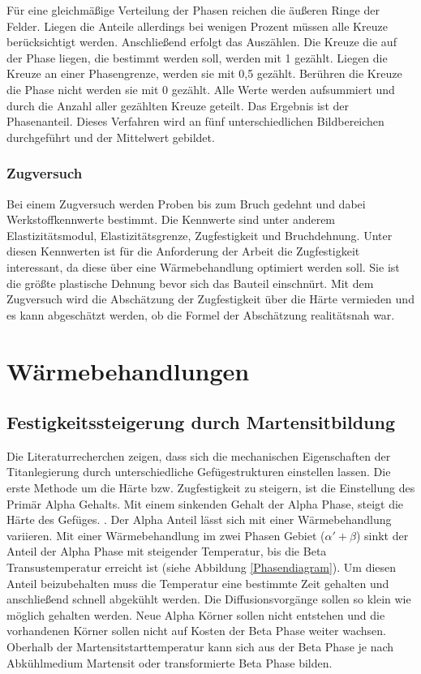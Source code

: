 \documentclass[a4paper, 11pt]{tubsreprt}
\begin{document}
Für eine gleichmäßige Verteilung der Phasen reichen die äußeren Ringe der Felder. Liegen die Anteile allerdings bei wenigen Prozent müssen alle Kreuze berücksichtigt werden. 
Anschließend erfolgt das Auszählen. Die Kreuze die auf der Phase liegen, die bestimmt werden soll, werden mit 1 gezählt. Liegen die Kreuze an einer Phasengrenze, werden sie mit 0,5 gezählt. Berühren die Kreuze die Phase nicht werden sie mit 0 gezählt. Alle Werte werden aufsummiert und durch die Anzahl aller gezählten Kreuze geteilt. Das Ergebnis ist der Phasenanteil. Dieses Verfahren wird an fünf unterschiedlichen Bildbereichen durchgeführt und der Mittelwert gebildet.

\subsection{Zugversuch}

Bei einem Zugversuch werden Proben bis zum Bruch gedehnt und dabei Werkstoffkennwerte bestimmt. Die Kennwerte sind unter anderem  Elastizitätsmodul, Elastizitätsgrenze, Zugfestigkeit und Bruchdehnung. Unter diesen Kennwerten ist für die Anforderung der Arbeit die Zugfestigkeit interessant, da diese über eine Wärmebehandlung optimiert werden soll. Sie ist die größte plastische Dehnung bevor sich das Bauteil einschnürt. Mit dem Zugversuch wird die Abschätzung der Zugfestigkeit über die Härte vermieden und es kann abgeschätzt werden, ob die Formel der Abschätzung realitätsnah war. 

\chapter{Wärmebehandlungen}
\section{Festigkeitssteigerung durch Martensitbildung}
Die Literaturrecherchen zeigen, dass sich die mechanischen Eigenschaften der Titanlegierung durch unterschiedliche Gefügestrukturen einstellen lassen. Die erste Methode um die Härte bzw. Zugfestigkeit zu steigern, ist die Einstellung des Primär Alpha Gehalts. Mit einem sinkenden Gehalt der Alpha Phase, steigt die Härte des Gefüges. \cite{Sahoo2015}. Der Alpha Anteil lässt sich mit einer Wärmebehandlung variieren. 
Mit einer Wärmebehandlung im zwei Phasen Gebiet ($\alpha'+ \beta$) sinkt der Anteil der Alpha Phase mit steigender Temperatur, bis die Beta Transustemperatur erreicht ist (siehe Abbildung \ref{Phasendiagram}). Um diesen Anteil beizubehalten muss die Temperatur eine bestimmte Zeit gehalten und anschließend schnell abgekühlt werden. Die Diffusionsvorgänge sollen so klein wie möglich gehalten werden. Neue Alpha Körner sollen nicht entstehen und die vorhandenen Körner sollen nicht auf Kosten der Beta Phase weiter wachsen. Oberhalb der Martensitstarttemperatur kann sich aus der Beta Phase je nach Abkühlmedium Martensit oder transformierte Beta Phase bilden.
\end{document}
